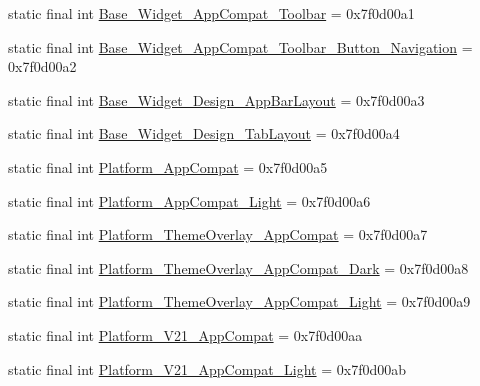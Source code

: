 \begin{DoxyCompactItemize}
\item 
static final int \mbox{\hyperlink{classandroid_1_1support_1_1design_1_1_r_1_1style_a288f7bda20a0a4f6422a8a02ebb0e945}{Base\+\_\+\+Widget\+\_\+\+App\+Compat\+\_\+\+Toolbar}} = 0x7f0d00a1
\item 
static final int \mbox{\hyperlink{classandroid_1_1support_1_1design_1_1_r_1_1style_ab13628e7e74bf48ac4e618287e6bff4e}{Base\+\_\+\+Widget\+\_\+\+App\+Compat\+\_\+\+Toolbar\+\_\+\+Button\+\_\+\+Navigation}} = 0x7f0d00a2
\item 
static final int \mbox{\hyperlink{classandroid_1_1support_1_1design_1_1_r_1_1style_a1d4fa19f851634c2d7df19f13ed32d06}{Base\+\_\+\+Widget\+\_\+\+Design\+\_\+\+App\+Bar\+Layout}} = 0x7f0d00a3
\item 
static final int \mbox{\hyperlink{classandroid_1_1support_1_1design_1_1_r_1_1style_a45452ddaf6cb0ff3c1fba11ccaa82526}{Base\+\_\+\+Widget\+\_\+\+Design\+\_\+\+Tab\+Layout}} = 0x7f0d00a4
\item 
static final int \mbox{\hyperlink{classandroid_1_1support_1_1design_1_1_r_1_1style_a5be61a46aa87257526f21945abcb1e6a}{Platform\+\_\+\+App\+Compat}} = 0x7f0d00a5
\item 
static final int \mbox{\hyperlink{classandroid_1_1support_1_1design_1_1_r_1_1style_af1cc29433f47e8f74d2b4a99ca31bf2e}{Platform\+\_\+\+App\+Compat\+\_\+\+Light}} = 0x7f0d00a6
\item 
static final int \mbox{\hyperlink{classandroid_1_1support_1_1design_1_1_r_1_1style_a174877dc3fe691299685c566a680f6dd}{Platform\+\_\+\+Theme\+Overlay\+\_\+\+App\+Compat}} = 0x7f0d00a7
\item 
static final int \mbox{\hyperlink{classandroid_1_1support_1_1design_1_1_r_1_1style_addbc8b61ae0af4b936ddbeb11b8eb1a9}{Platform\+\_\+\+Theme\+Overlay\+\_\+\+App\+Compat\+\_\+\+Dark}} = 0x7f0d00a8
\item 
static final int \mbox{\hyperlink{classandroid_1_1support_1_1design_1_1_r_1_1style_a2a388b085535b1ef7e8936d787749259}{Platform\+\_\+\+Theme\+Overlay\+\_\+\+App\+Compat\+\_\+\+Light}} = 0x7f0d00a9
\item 
static final int \mbox{\hyperlink{classandroid_1_1support_1_1design_1_1_r_1_1style_a40327e4c66ec6572714bb9b8e081d2c9}{Platform\+\_\+\+V21\+\_\+\+App\+Compat}} = 0x7f0d00aa
\item 
static final int \mbox{\hyperlink{classandroid_1_1support_1_1design_1_1_r_1_1style_ab1504214ab2f11159cda855bf4e40920}{Platform\+\_\+\+V21\+\_\+\+App\+Compat\+\_\+\+Light}} = 0x7f0d00ab
\item 

\end{DoxyCompactItemize}

